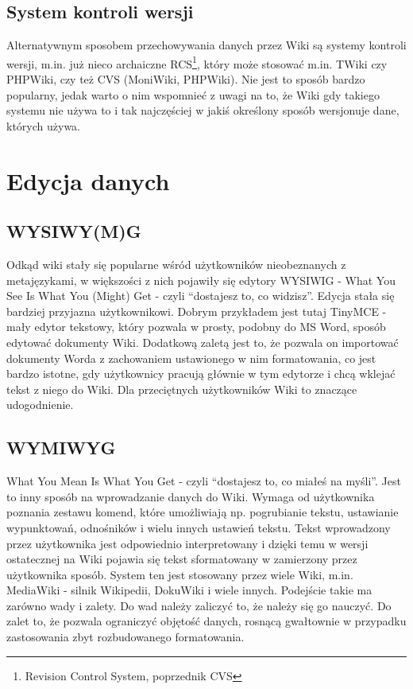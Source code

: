 \documentclass{article}
\begin{document}
	\subsection{System kontroli wersji}
	Alternatywnym sposobem przechowywania danych przez Wiki są systemy kontroli wersji, m.in. już nieco archaiczne RCS\footnote{Revision Control System, poprzednik CVS}, który może stosować m.in. TWiki czy PHPWiki, czy też CVS (MoniWiki, PHPWiki). Nie jest to sposób bardzo popularny, jedak warto o nim wspomnieć z uwagi na to, że Wiki gdy takiego systemu nie używa to i tak najczęściej w jakiś określony sposób wersjonuje dane, których używa.
\newpage
\section{Edycja danych}
	\subsection{WYSIWY(M)G}
	Odkąd wiki stały się popularne wśród użytkowników nieobeznanych z metajęzykami, 
w większości z nich pojawiły się edytory WYSIWIG - What You See Is What You (Might) Get - czyli ``dostajesz to, co widzisz''. Edycja stała się bardziej przyjazna użytkownikowi. Dobrym przykładem jest tutaj TinyMCE - mały edytor tekstowy, który pozwala w prosty, podobny do MS Word, sposób edytować dokumenty Wiki. Dodatkową zaletą jest to, że pozwala on importować dokumenty Worda z zachowaniem ustawionego w nim formatowania, co jest bardzo istotne, gdy użytkownicy pracują głównie w tym edytorze i chcą wklejać tekst z niego do Wiki. Dla przeciętnych użytkowników Wiki to znaczące udogodnienie.

	\subsection{WYMIWYG}
	
What You Mean Is What You Get - czyli ``dostajesz to, co miałeś na myśli''. Jest to inny sposób na wprowadzanie danych do Wiki. Wymaga od użytkownika poznania zestawu komend, które umożliwiają np. pogrubianie tekstu, ustawianie wypunktowań, odnośników i wielu innych ustawień tekstu. Tekst wprowadzony przez użytkownika jest odpowiednio interpretowany i dzięki temu w wersji ostatecznej na Wiki pojawia się tekst sformatowany w zamierzony przez użytkownika sposób. System ten jest stosowany przez wiele Wiki, m.in. MediaWiki - silnik Wikipedii, DokuWiki i wiele innych. Podejście takie ma zarówno wady i zalety. Do wad należy zaliczyć to, że należy się go nauczyć. Do zalet to, że pozwala ograniczyć objętość danych, rosnącą gwałtownie w przypadku zastosowania zbyt rozbudowanego formatowania.
\end{document}
